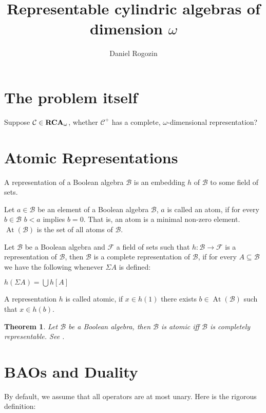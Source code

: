 \documentclass[a4paper]{article}
\author{Daniel Rogozin}
\date{}
\title{Representable cylindric algebras of dimension $\omega$}
\theoremstyle{defin}
\theoremstyle{theorem}
\newtheorem{theorem}{Theorem}
\theoremstyle{prop}
\theoremstyle{lemma}
\theoremstyle{fact}
\theoremstyle{ex}
\theoremstyle{col}
\begin{document}
\maketitle

\section{The problem itself}

Suppose $\mathcal{C} \in {\bf RCA}_{\omega}$, whether $\mathcal{C}^{+}$ has a complete, $\omega$-dimensional representation? \cite{hirsch2002relation}

\section{Atomic Representations}

A representation of a Boolean algebra $\mathcal{B}$ is an embedding $h$ of $\mathcal{B}$ to some field of sets.

Let $a \in \mathcal{B}$ be an element of a Boolean algebra $\mathcal{B}$, $a$ is called an atom, if for every $b \in \mathcal{B}$
$b < a$ implies $b = 0$. That is, an atom is a minimal non-zero element. $\operatorname{At}(\mathcal{B})$ is the set of all atoms
of $\mathcal{B}$.

Let $\mathcal{B}$ be a Boolean algebra and $\mathcal{F}$ a field of sets such that $h : \mathcal{B} \to \mathcal{F}$ is a
representation of $\mathcal{B}$, then $\mathcal{B}$ is a complete representation of $\mathcal{B}$, if for every
$A \subseteq \mathcal{B}$ we have the following whenever $\Sigma A$ is defined:
\begin{center}
  $h(\Sigma A) = \bigcup h[A]$
\end{center}

A representation $h$ is called atomic, if $x \in h(1)$ there exists $b \in \operatorname{At}(\mathcal{B})$ such that $x \in h(b)$.

\begin{theorem} \label{completeboolean}
  Let $\mathcal{B}$ be a Boolean algebra, then $\mathcal{B}$ is atomic iff $\mathcal{B}$ is completely representable. See \cite[Corollary 6]{hirsch1997complete}.
\end{theorem}

\section{BAOs and Duality}

By default, we assume that all operators are at most unary. Here is the rigorous definition:
\end{document}
